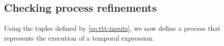 \subsection{Checking process refinements}
\label{sec:seqs-to-process}

Using the tuples defined by \cref{eq:ttt-inputs}, we now define a process that represents the execution of a temporal expression.